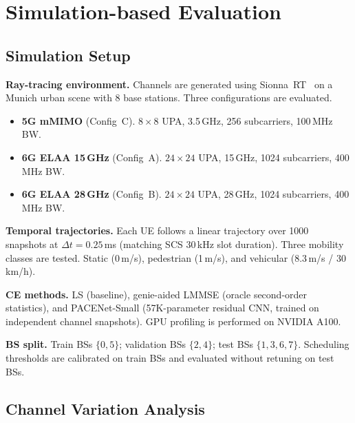 
\section{Simulation-based Evaluation}\label{Eval}

\subsection{Simulation Setup}

\textbf{Ray-tracing environment.}
Channels are generated using Sionna~RT~\cite{sionna2023} on a Munich urban scene with 8 base stations.
Three configurations are evaluated.
%
\begin{itemize}
\item \textbf{5G mMIMO} (Config~C). $8 \times 8$ UPA, 3.5\,GHz, 256 subcarriers, 100\,MHz BW.
\item \textbf{6G ELAA 15\,GHz} (Config~A). $24 \times 24$ UPA, 15\,GHz, 1024 subcarriers, 400\,MHz BW.
\item \textbf{6G ELAA 28\,GHz} (Config~B). $24 \times 24$ UPA, 28\,GHz, 1024 subcarriers, 400\,MHz BW.
\end{itemize}

\textbf{Temporal trajectories.}
Each UE follows a linear trajectory over 1000 snapshots at $\Delta t = 0.25$\,ms (matching SCS 30\,kHz slot duration).
Three mobility classes are tested.
Static (0\,m/s), pedestrian (1\,m/s), and vehicular (8.3\,m/s / 30\,km/h).

\textbf{CE methods.}
LS (baseline), genie-aided LMMSE (oracle second-order statistics), and PACENet-Small (57K-parameter residual CNN, trained on independent channel snapshots).
GPU profiling is performed on NVIDIA A100.

\textbf{BS split.}
Train BSs $\{0, 5\}$; validation BSs $\{2, 4\}$; test BSs $\{1, 3, 6, 7\}$.
Scheduling thresholds are calibrated on train BSs and evaluated without retuning on test BSs.

\subsection{Channel Variation Analysis}


